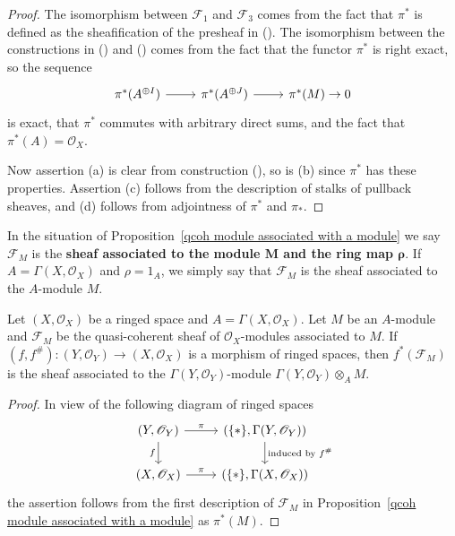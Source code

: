 \begin{proof}
The isomorphism between $\mathscr{F}_1$ and $\mathscr{F}_3$ comes from the fact that $\pi^*$ is defined as the sheafification of the presheaf in (). The isomorphism between the constructions in () and () comes from the fact that the functor $\pi^*$ is right exact, so the sequence
\[\begin{tikzcd}
\pi^*(A^{\oplus I})\ar[r]&\pi^*(A^{\oplus J})\ar[r]&\pi^*(M)\to 0
\end{tikzcd}\] 
is exact, that $\pi^*$ commutes with arbitrary direct sums, and the fact that $\pi^*(A)=\mathscr{O}_X$.\par
Now assertion (a) is clear from construction (), so is (b) since $\pi^*$ has these properties. Assertion (c) follows from the description of stalks of pullback sheaves, and (d) follows from adjointness of $\pi^*$ and $\pi_*$.
\end{proof}
In the situation of Proposition~\ref{qcoh module associated with a module} we say $\mathscr{F}_M$ is the \textbf{sheaf associated to the module $\bm{M}$ and the ring map $\bm{\rho}$}. If $A=\Gamma(X,\mathscr{O}_X)$ and $\rho=1_A$, we simply say that $\mathscr{F}_M$ is the sheaf associated to the $A$-module $M$.
\begin{proposition}\label{qcoh module associated with a module and pull back}
Let $(X,\mathscr{O}_X)$ be a ringed space and $A=\Gamma(X,\mathscr{O}_X)$. Let $M$ be an $A$-module and $\mathscr{F}_M$ be the quasi-coherent sheaf of $\mathscr{O}_X$-modules associated to $M$. If $(f,f^{\#}):(Y,\mathscr{O}_Y)\to(X,\mathscr{O}_X)$ is a morphism of ringed spaces, then $f^*(\mathscr{F}_M)$ is the sheaf associated to the $\Gamma(Y,\mathscr{O}_Y)$-module $\Gamma(Y,\mathscr{O}_Y)\otimes_AM$.
\end{proposition}
\begin{proof}
In view of the following diagram of ringed spaces
\begin{equation*}
\begin{tikzcd}
(Y,\mathscr{O}_Y)\ar[r,"\pi"]\ar[d,swap,"f"]&(\{\ast\},\Gamma(Y,\mathscr{O}_Y))\ar[d,"\text{induced by $f^{\#}$}"]\\
(X,\mathscr{O}_X)\ar[r,"\pi"]&(\{\ast\},\Gamma(X,\mathscr{O}_X))
\end{tikzcd}
\end{equation*}
the assertion follows from the first description of $\mathscr{F}_M$ in Proposition~\ref{qcoh module associated with a module} as $\pi^*(M)$.
\end{proof}
